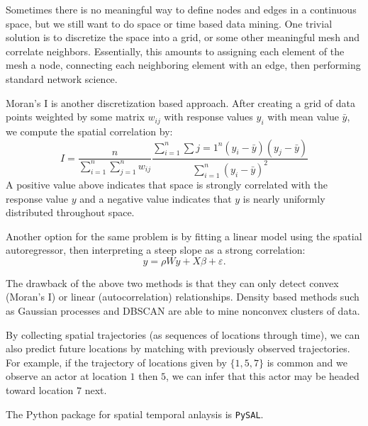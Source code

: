 \documentclass[12pt]{article}
\begin{document}
Sometimes there is no meaningful way to define nodes and edges in a continuous
space, but we still want to do space or time based data mining.
One trivial solution is to discretize the space into a grid, or some other
meaningful mesh and correlate neighbors.
Essentially, this amounts to assigning each element of the mesh a node,
connecting each neighboring element with an edge, then performing
standard network science.

Moran's I is another discretization based approach.
After creating a grid of data points weighted by some matrix $w_{ij}$ with 
response values $y_i$ with mean value $\bar{y}$, we compute the spatial 
correlation by:
$$
I = \frac{n}{\sum_{i=1}^n\sum_{j=1}^n w_{ij}}
\frac{\sum_{i=1}^n\sum{j=1}^n(y_i - \bar{y})(y_j - \bar{y})}
{\sum_{i=1}^n(y_i - \bar{y})^2}
$$
A positive value above indicates that space is strongly correlated with
the response value $y$ and a negative value indicates that $y$ is nearly
uniformly distributed throughout space.

Another option for the same problem is by fitting a linear model using the
spatial autoregressor,
then interpreting a steep slope as a strong correlation:
$$
y = \rho W y + X \beta + \varepsilon.
$$

The drawback of the above two methods is that they can only detect convex 
(Moran's I) or linear (autocorrelation) relationships.
Density based methods such as Gaussian processes and DBSCAN are
able to mine nonconvex clusters of data.

By collecting spatial trajectories (as sequences of locations through time),
we can also predict future locations by matching with previously observed
trajectories.
For example, if the trajectory of locations given by $\{1, 5, 7\}$ is common
and we observe an actor at location $1$ then $5$, we can infer that this
actor may be headed toward location $7$ next.

The Python package for spatial temporal anlaysis is {\tt PySAL}.
\end{document}
